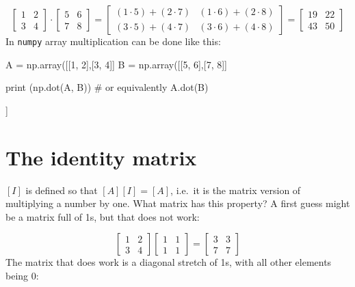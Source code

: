 \begin{equation*} 
\begin{bmatrix}
1 & 2 \\
3 & 4
\end{bmatrix}
\cdot
\begin{bmatrix}
5 & 6 \\
7 & 8
\end{bmatrix}
=
\begin{bmatrix}
(1\cdot 5) + (2\cdot 7) & (1\cdot 6) + (2\cdot 8)  \\
(3\cdot 5) + (4\cdot 7) & (3\cdot 6) + (4\cdot 8) 
\end{bmatrix}
=
\begin{bmatrix}
19 & 22 \\
43 & 50 
\end{bmatrix}
\end{equation*}
In \texttt{numpy} array multiplication can be done like this:

\begin{ipython}
A = np.array([[1, 2],[3, 4]]
B = np.array([[5, 6],[7, 8]]
	
print (np.dot(A, B))
# or equivalently A.dot(B)
\end{ipython}
\begin{ioutput}
[[19 22]
 [43 50]]
\end{ioutput}

\section{The identity matrix}\label{the-identity-matrix}

$[I]$ is defined so that $[A][I]=[A]$, i.e.~it is the matrix version of multiplying a number by one. What matrix has this property? A first guess might be a matrix full of 1s, but that does not work:

\begin{equation*}
\begin{bmatrix}
1 & 2 \\
3 & 4
\end{bmatrix}
\begin{bmatrix}
1 & 1 \\
1 & 1
\end{bmatrix}
=
\begin{bmatrix}
3 & 3 \\
7 & 7
\end{bmatrix}
\end{equation*}
The matrix that does work is a diagonal stretch of 1s, with all other elements being 0:

